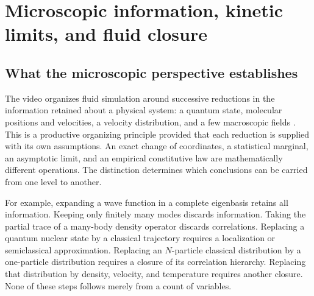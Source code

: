 \chapter{Microscopic information, kinetic limits, and fluid closure}
\label{ch:microscopic-fluid-limits}


\section{What the microscopic perspective establishes}

The video organizes fluid simulation around successive reductions in the
information retained about a physical system: a quantum state, molecular
positions and velocities, a velocity distribution, and a few macroscopic
fields \citep{microBraintruffle2021}.  This is a productive organizing principle
provided that each reduction is supplied with its own assumptions.  An
exact change of coordinates, a statistical marginal, an asymptotic limit,
and an empirical constitutive law are mathematically different operations.
The distinction determines which conclusions can be carried from one level
to another.

For example, expanding a wave function in a complete eigenbasis retains
all information.  Keeping only finitely many modes discards information.
Taking the partial trace of a many-body density operator discards
correlations.  Replacing a quantum nuclear state by a classical trajectory
requires a localization or semiclassical approximation.  Replacing an
$N$-particle classical distribution by a one-particle distribution requires
a closure of its correlation hierarchy.  Replacing that distribution by
density, velocity, and temperature requires another closure.  None of these
steps follows merely from a count of variables.

